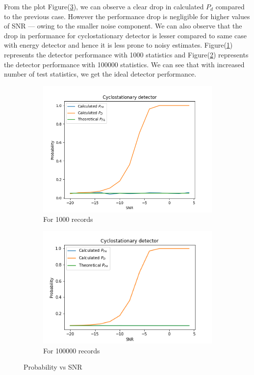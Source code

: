 \documentclass[a4 paper]{article}
\begin{document}
From the plot Figure(\ref{fig:cyclo_c}), we can observe a clear drop in calculated $P_{d}$ compared to the previous case. However the performance drop is negligible for higher values of SNR --- owing to the smaller noise component. We can also observe that the drop in performance for cyclostationary detector is lesser compared to same case with energy detector and hence it is less prone to noisy estimates. Figure(\ref{fig:cyclo_c1}) represents the detector performance with 1000 statistics and Figure(\ref{fig:cyclo_c2}) represents the detector performance with 100000 statistics. We can see that with increased number of test statistics, we get the ideal detector performance. 
\begin{figure}[h]
	\centering
	\begin{subfigure}{.5\textwidth}
		\includegraphics[width=1\linewidth]{../results/cyclostationary_detector_c.png}
		\caption{For 1000 records}
		\label{fig:cyclo_c1}
	\end{subfigure}%
	\begin{subfigure}{.5\textwidth}
		\includegraphics[width=1.15\linewidth]{../results/cyclostationary_detector_c_ideal.png}
		\caption{For 100000 records}
		\label{fig:cyclo_c2}
	\end{subfigure}
	\caption{Probability vs SNR}
	\label{fig:cyclo_c}
\end{figure}
\end{document}
